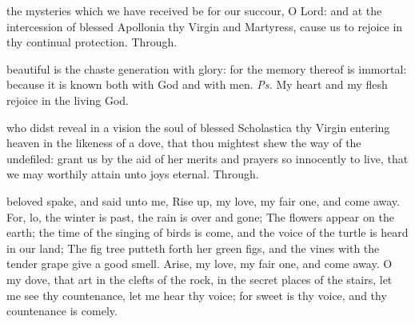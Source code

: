 \postcommunion
{} the mysteries which we have received be for our succour, O Lord: and at the intercession of blessed Apollonia thy Virgin and Martyress, cause us to rejoice in thy continual protection. Through.



\introit
{} beautiful is the chaste generation with glory: for the memory thereof is immortal: because it is known both with God and with men. \textit{Ps.} My heart and my flesh rejoice in the living God.

\collect
{} who didst reveal in a vision the soul of blessed Scholastica thy Virgin entering heaven in the likeness of a dove, that thou mightest shew the way of the undefiled: grant us by the aid of her merits and prayers so innocently to live, that we may worthily attain unto joys eternal. Through.

 beloved spake, and said unto me, Rise up, my love, my fair one, and come away. For, lo, the winter is past, the rain is over and gone; The flowers appear on the earth; the time of the singing of birds is come, and the voice of the turtle is heard in our land; The fig tree putteth forth her green figs, and the vines with the tender grape give a good smell. Arise, my love, my fair one, and come away. O my dove, that art in the clefts of the rock, in the secret places of the stairs, let me see thy countenance, let me hear thy voice; for sweet is thy voice, and thy countenance is comely.


\tractnotice


